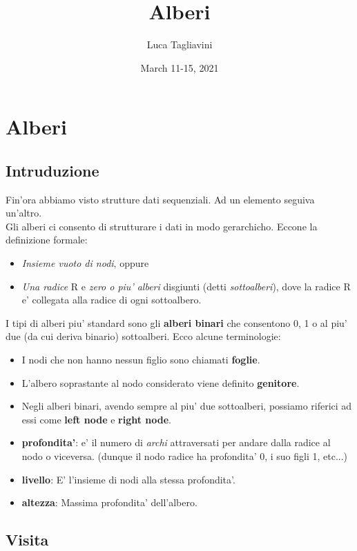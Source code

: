 \documentclass{article}
\title{\textbf{Alberi}}
\author{Luca Tagliavini}
\date{March 11-15, 2021}
\begin{document}
\maketitle
\tableofcontents
\pagebreak

\section{Alberi}
\subsection{Intruduzione}

Fin'ora abbiamo visto strutture dati sequenziali. Ad un elemento seguiva un'altro. \\
Gli alberi ci consento di strutturare i dati in modo gerarchicho. Eccone la definizione formale:
\begin{itemize}
  \item \emph{Insieme vuoto di nodi}, oppure
  \item \emph{Una radice} R e \emph{zero o piu' alberi} disgiunti (detti \emph{sottoalberi}),
    dove la radice R e' collegata alla radice di ogni sottoalbero.
\end{itemize}

I tipi di alberi piu' standard sono gli \textbf{alberi binari} che consentono 0,
1 o al piu' due (da cui deriva binario) sottoalberi. Ecco alcune terminologie:
\begin{itemize}
  \item I nodi che non hanno nessun figlio sono chiamati \textbf{foglie}.
  \item L'albero soprastante al nodo considerato viene definito \textbf{genitore}.
  \item Negli alberi binari, avendo sempre al piu' due sottoalberi, possiamo riferici
    ad essi come \textbf{left node} e \textbf{right node}. \\
  \item \textbf{profondita'}: e' il numero di \emph{archi} attraversati per andare
    dalla radice al nodo o viceversa. (dunque il nodo radice ha profondita' 0, i suo figli 1, etc...)
  \item \textbf{livello}: E' l'insieme di nodi alla stessa profondita'.
  \item \textbf{altezza}: Massima profondita' dell'albero.
\end{itemize}

\subsection{Visita}
\end{document}
